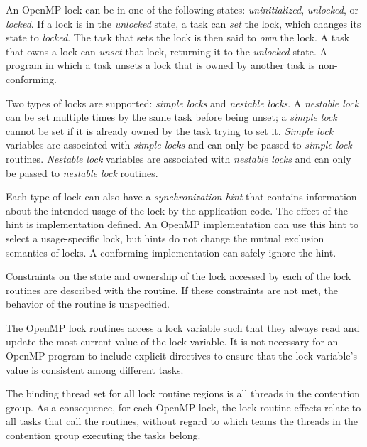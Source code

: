 An OpenMP lock can be in one of the following states: \emph{uninitialized}, \emph{unlocked}, or 
\emph{locked}. If a lock is in the \emph{unlocked} state, a task can \emph{set} the lock, which changes its state 
to \emph{locked}. The task that sets the lock is then said to \emph{own} the lock. A task that owns a 
lock can \emph{unset} that lock, returning it to the \emph{unlocked} state. A program in which a task 
unsets a lock that is owned by another task is non-conforming.

Two types of locks are supported: \emph{simple locks} and \emph{nestable locks}. A \emph{nestable lock} can 
be set multiple times by the same task before being unset; a \emph{simple lock} cannot be set if 
it is already owned by the task trying to set it. \emph{Simple lock} variables are associated with 
\emph{simple locks} and can only be passed to \emph{simple lock} routines. \emph{Nestable lock} variables are 
associated with \emph{nestable locks} and can only be passed to \emph{nestable lock} routines.

Each type of lock can also have a \emph{synchronization hint} that contains information about the intended usage 
of the lock by the application code.  The effect of the hint is
implementation defined.  An OpenMP implementation can use this hint to select a
usage-specific lock, but hints do not change the mutual exclusion semantics of locks. 
A conforming implementation can safely ignore the hint.

Constraints on the state and ownership of the lock accessed by each of the lock routines 
are described with the routine. If these constraints are not met, the behavior of the 
routine is unspecified. 

The OpenMP lock routines access a lock variable such that they always read 
and update the most current value of the lock variable. It is not necessary for an 
OpenMP program to include explicit  directives to ensure that the lock variable's 
value is consistent among different tasks. 

\vspace{-8pt}

\binding
The binding thread set for all lock routine regions is all threads in the contention group. 
As a consequence, for each OpenMP lock, the lock routine effects relate to all tasks that 
call the routines, without regard to which teams the threads in the contention group 
executing the tasks belong.


\vspace{-8pt}

